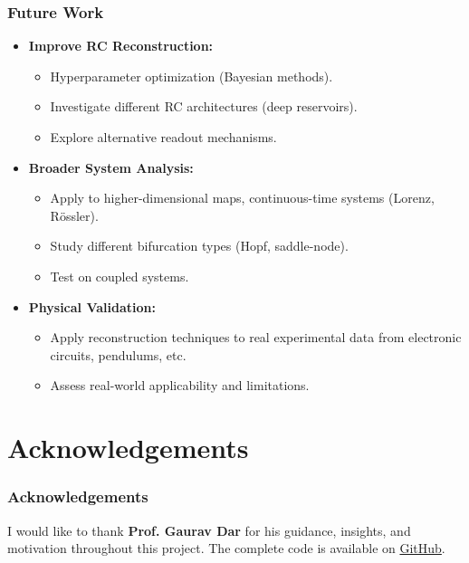 \documentclass{beamer}
\begin{document}
\begin{frame}
    \frametitle{Future Work}
    \begin{itemize}
        \item \textbf{Improve RC Reconstruction:}
            \begin{itemize}
                \item Hyperparameter optimization (Bayesian methods).
                \item Investigate different RC architectures (deep reservoirs).
                \item Explore alternative readout mechanisms.
            \end{itemize}
        \pause
        \item \textbf{Broader System Analysis:}
            \begin{itemize}
                \item Apply to higher-dimensional maps, continuous-time systems (Lorenz, Rössler).
                \item Study different bifurcation types (Hopf, saddle-node).
                \item Test on coupled systems.
            \end{itemize}
        \pause
        \item \textbf{Physical Validation:}
            \begin{itemize}
                \item Apply reconstruction techniques to real experimental data from electronic circuits, pendulums, etc.
                \item Assess real-world applicability and limitations.
            \end{itemize}
    \end{itemize}
\end{frame}

\section*{Acknowledgements}

\begin{frame}
    \frametitle{Acknowledgements}
    \bigskip %
    I would like to thank \textbf{Prof. Gaurav Dar} for his guidance, insights, and motivation throughout this project.
    \vspace{2em} %
     The complete code is available on \href{https://github.com/vimarsh244/ResorvoirComputing_SOP}{GitHub}.

\end{frame}
\end{document}
